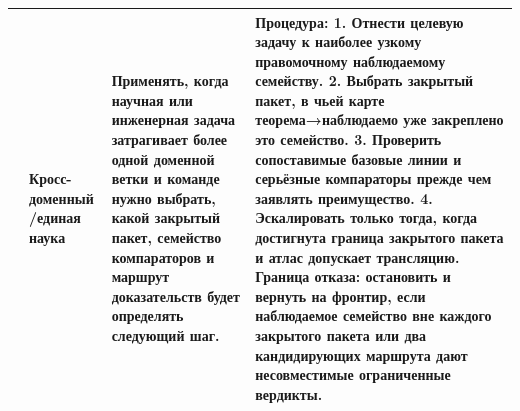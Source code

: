 \begin{longtable}{@{}L{0.15\textwidth}L{0.13\textwidth}L{0.18\textwidth}L{0.38\textwidth}@{}}
 & Кросс-доменный /\allowbreak единая наука & Применять, когда научная или инженерная задача затрагивает более одной доменной ветки и команде нужно выбрать, какой закрытый пакет, семейство компараторов и маршрут доказательств будет определять следующий шаг. & Процедура: 1. Отнести целевую задачу к наиболее узкому правомочному наблюдаемому семейству. 2. Выбрать закрытый пакет, в чьей карте теорема→наблюдаемо уже закреплено это семейство. 3. Проверить сопоставимые базовые линии и серьёзные компараторы прежде чем заявлять преимущество. 4. Эскалировать только тогда, когда достигнута граница закрытого пакета и атлас допускает трансляцию. \allowbreak Граница отказа: остановить и вернуть на фронтир, если наблюдаемое семейство вне каждого закрытого пакета или два кандидирующих маршрута дают несовместимые ограниченные вердикты. \\
\bottomrule
\end{longtable}

